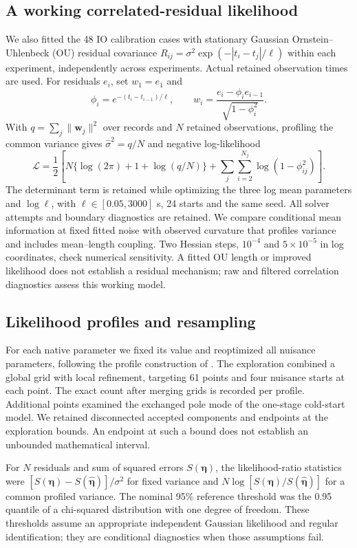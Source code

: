 \subsection{A working correlated-residual likelihood}
We also fitted the 48 IO calibration cases with stationary Gaussian
Ornstein--Uhlenbeck (OU) residual
covariance $R_{ij}=\sigma^2\exp(-|t_i-t_j|/\ell)$ within each experiment,
independently across experiments. Actual retained observation times are used.
For residuals $e_i$, set $w_1=e_1$ and
\[
 \phi_i=e^{-(t_i-t_{i-1})/\ell},\qquad
 w_i=\frac{e_i-\phi_i e_{i-1}}{\sqrt{1-\phi_i^2}}.
\]
With $q=\sum_j\|\bm w_j\|^2$ over records and $N$ retained observations,
profiling the common variance gives $\hat\sigma^2=q/N$ and negative
log-likelihood
\[
 \mathcal L=\frac12\left[
 N\{\log(2\pi)+1+\log(q/N)\}
 +\sum_j\sum_{i=2}^{N_j}\log(1-\phi_{ij}^2)\right].
\]
The determinant term is retained while optimizing the three log mean parameters
and $\log\ell$, with $\ell\in[0.05,3000]$ s, 24 starts and the same seed.
All solver attempts and boundary diagnostics are retained. We compare
conditional mean information at fixed fitted noise with observed curvature
that profiles variance and includes mean--length coupling. Two Hessian steps,
$10^{-4}$ and $5\times10^{-5}$ in log coordinates, check numerical sensitivity.
A fitted OU length or improved likelihood does not establish a residual
mechanism; raw and filtered correlation diagnostics assess this working model.

\subsection{Likelihood profiles and resampling}
For each native parameter we fixed its value and reoptimized all nuisance
parameters, following the profile construction of \citet{raue-2009-structural}.
The exploration combined a global grid with local refinement, targeting 61 points
and four nuisance starts at each point. The exact count after merging grids is
recorded per profile. Additional points examined the exchanged
pole mode of the one-stage cold-start model. We retained disconnected accepted
components and endpoints at the exploration bounds. An endpoint at such a bound
does not establish an unbounded mathematical interval.

For $N$ residuals and sum of squared errors $S(\bm\eta)$, the likelihood-ratio
statistics were $[S(\bm\eta)-S(\hat{\bm\eta})]/\sigma^2$ for fixed variance
and $N\log[S(\bm\eta)/S(\hat{\bm\eta})]$ for a common profiled variance.
The nominal 95\% reference threshold was the 0.95 quantile of a chi-squared
distribution with one degree of freedom. These thresholds assume an appropriate
independent Gaussian likelihood and regular identification; they are conditional
diagnostics when those assumptions fail.

